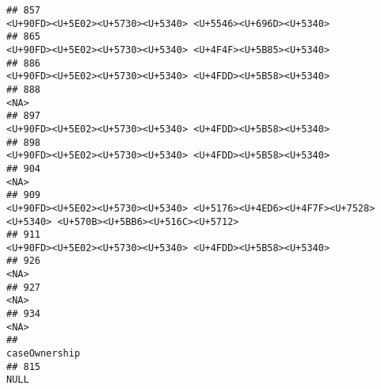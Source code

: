 \documentclass[
]{article}
\begin{document}
\begin{verbatim}
## 857                                                                                                                   <U+90FD><U+5E02><U+5730><U+5340> <U+5546><U+696D><U+5340>
## 865                                                                                                                   <U+90FD><U+5E02><U+5730><U+5340> <U+4F4F><U+5B85><U+5340>
## 886                                                                                                                   <U+90FD><U+5E02><U+5730><U+5340> <U+4FDD><U+5B58><U+5340>
## 888                                                                                                                                                                        <NA>
## 897                                                                                                                   <U+90FD><U+5E02><U+5730><U+5340> <U+4FDD><U+5B58><U+5340>
## 898                                                                                                                   <U+90FD><U+5E02><U+5730><U+5340> <U+4FDD><U+5B58><U+5340>
## 904                                                                                                                                                                        <NA>
## 909                                                                  <U+90FD><U+5E02><U+5730><U+5340> <U+5176><U+4ED6><U+4F7F><U+7528><U+5340> <U+570B><U+5BB6><U+516C><U+5712>
## 911                                                                                                                   <U+90FD><U+5E02><U+5730><U+5340> <U+4FDD><U+5B58><U+5340>
## 926                                                                                                                                                                        <NA>
## 927                                                                                                                                                                        <NA>
## 934                                                                                                                                                                        <NA>
##                                                                                                                                                                                                                                                                                                                          caseOwnership
## 815                                                                                                                                                                                                                                                                                                                               NULL

\end{verbatim}
\end{document}
